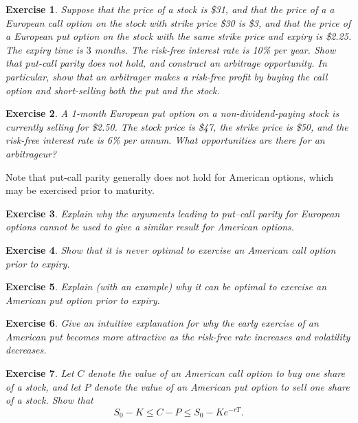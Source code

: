 \documentclass[letterpaper,10pt]{article}
\newtheorem{ex}{Exercise}
\begin{document}
\begin{ex}
Suppose that the price of a stock is \$31, and that the price of a a European call option on the stock with strike price \$30 is \$3, and that the price of a European put option on the stock with the same strike price and expiry is \$2.25.  The expiry time is $3$ months.  The risk-free interest rate is 10\% per year.  Show that put-call parity does not hold, and construct an arbitrage opportunity.  In particular, show that an arbitrager makes a risk-free profit by buying the call option and short-selling both the put and the stock.  
\end{ex}



\begin{ex}
A 1-month European put option on a non-dividend-paying stock is currently selling for \$2.50. The stock price is \$47, the strike price is \$50, and the risk-free interest rate is 6\% per annum. What opportunities are there for an arbitrageur?
\end{ex}





\noindent Note that put-call parity generally does not hold for American options, which may be exercised prior to maturity.



\begin{ex}
Explain why the arguments leading to put–call parity for European options cannot be used to give a similar result for American options.
\end{ex}



\begin{ex}
Show that it is never optimal to exercise an American call option prior to expiry.
\end{ex}


\begin{ex}
Explain (with an example) why it can be optimal to exercise an American put option prior to expiry.
\end{ex}



\begin{ex}
Give an intuitive explanation for why the early exercise of an American put becomes more attractive as the risk-free rate increases and volatility decreases.
\end{ex}



\begin{ex}
Let $C$ denote the value of an American call option to buy one share of a stock, and let $P$ denote the value of an American put option to sell one share of a stock.  Show that $$S_0-K\leq C-P\leq S_0-Ke^{-rT}.$$
\end{ex}
\end{document}
